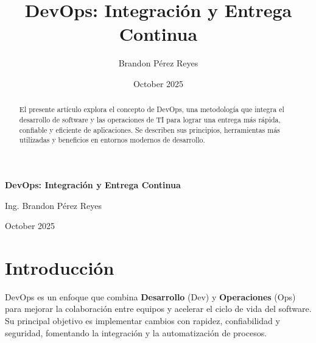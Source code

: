 \documentclass[12pt,a4paper]{article}
\title{\textbf{DevOps: Integración y Entrega Continua}}
\author{Brandon Pérez Reyes}
\date{October 2025}
\begin{document}
\begin{titlepage}
    \centering
    \vspace*{2cm}
    {\Huge \bfseries DevOps: Integración y Entrega Continua \par}
    \vspace{2cm}
    \par
    \vspace{2cm}
    {\Large Ing. Brandon Pérez Reyes \par}
    \vfill
    {\large October 2025 \par}
\end{titlepage}

\newpage

\begin{abstract}
El presente artículo explora el concepto de DevOps, una metodología que integra el desarrollo de software y las operaciones de TI para lograr una entrega más rápida, confiable y eficiente de aplicaciones. Se describen sus principios, herramientas más utilizadas y beneficios en entornos modernos de desarrollo.
\end{abstract}

\tableofcontents
\newpage

\section{Introducción}
DevOps es un enfoque que combina \textbf{Desarrollo} (Dev) y \textbf{Operaciones} (Ops) para mejorar la colaboración entre equipos y acelerar el ciclo de vida del software. Su principal objetivo es implementar cambios con rapidez, confiabilidad y seguridad, fomentando la integración y la automatización de procesos.
\end{document}
